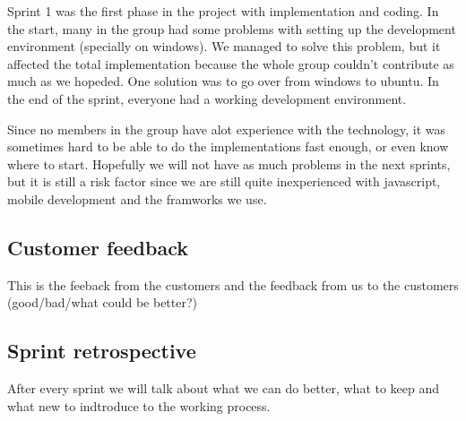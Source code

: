 Sprint 1 was the first phase in the project with implementation and coding. In the start, many in the group had
some problems with setting up the development environment (specially on windows). We managed
to solve this problem, but it affected the total implementation because the whole group couldn't 
contribute as much as we hopeded. One solution was to go over from windows to ubuntu. 
In the end of the sprint, everyone had a working development environment.

Since no members in the group have alot experience with the technology, it was sometimes hard
to be able to do the implementations fast enough, or even know where to start. 
Hopefully we will not have as much problems in the next sprints, but it is still a risk factor 
since we are still quite inexperienced with javascript, mobile development and the framworks we use. 

\subsection{Customer feedback}
	This is the feeback from the customers and the feedback from us to the customers (good/bad/what could be better?)

\subsection{Sprint retrospective}
	After every sprint we will talk about what we can do better, what to keep and what new to indtroduce to the working process.